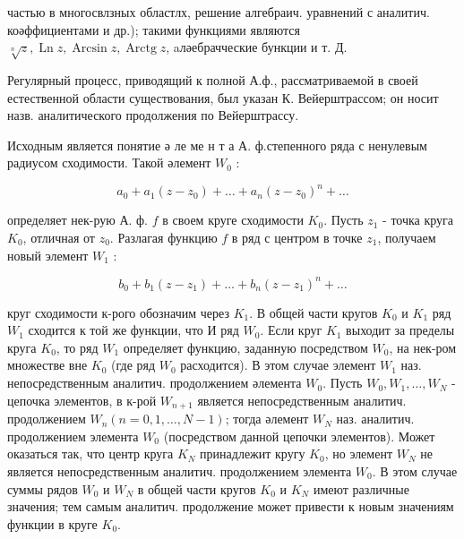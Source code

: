 \documentclass[10pt]{article}
\begin{document}
частью в многосвлзных областлх, решение алгебраич. уравнений с аналитич. коәффициентами и др.); такими функциями являются $\sqrt[n]{z}, \operatorname{Ln} z, \operatorname{Arcsin} z, \operatorname{Arctg} z$, aләебрачческие бункции и т. Д.



Регулярный процесс, приводящий к полной А.ф., рассматриваемой в своей естественной области существования, был указан К. Вейерштрассом; он носит назв. аналитического продолжения по Вейерштрассу.



Исходным является понятие ә ле ме н т а А. ф.степенного ряда с ненулевым радиусом сходимости. Такой әлемент $W_{0}$ :



\[

a_{0}+a_{1}\left(z-z_{0}\right)+\ldots+a_{n}\left(z-z_{0}\right)^{n}+\ldots

\]



определяет нек-рую А. ф. $f$ в своем круге сходимости $K_{0}$. Пусть $z_{1}$ - точка круга $K_{0}$, отличная от $z_{0}$. Разлагая функцию $f$ в ряд с центром в точке $z_{1}$, получаем новый элемент $W_{1}$ :



\[

b_{0}+b_{1}\left(z-z_{1}\right)+\ldots+b_{n}\left(z-z_{1}\right)^{n}+\ldots

\]



круг сходимости к-рого обозначим через $K_{1}$. В общей части кругов $K_{0}$ и $K_{1}$ ряд $W_{1}$ сходится к той же функции, что И ряд $W_{0}$. Если круг $K_{1}$ выходит за пределы круга $K_{0}$, то ряд $W_{1}$ определяет функцию, заданную посредством $W_{0}$, на нек-ром множестве вне $K_{0}$ (где ряд $W_{0}$ расходится). В этом случае элемент $W_{1}$ наз. непосредственным аналитич. продолжением әлемента $W_{0}$. Пусть $W_{0}, W_{1}, \ldots, W_{N}$ - цепочка элементов, в к-рой $W_{n+1}$ является непосредственным аналитич. продолжением $W_{n}(n=0,1, \ldots, N-1)$; тогда әлемент $W_{N}$ наз. аналитич. продолжением элемента $W_{0}$ (посредством данной цепочки элементов). Может оказаться так, что центр круга $K_{N}$ принадлежит кругу $K_{0}$, но элемент $W_{N}$ не является непосредственным аналитич. продолжением элемента $W_{0}$. В этом случае суммы рядов $W_{0}$ и $W_{N}$ в общей части кругов $K_{0}$ и $K_{N}$ имеют различные значения; тем самым аналитич. продолжение может привести к новым значениям функции в круге $K_{0}$.
\end{document}
